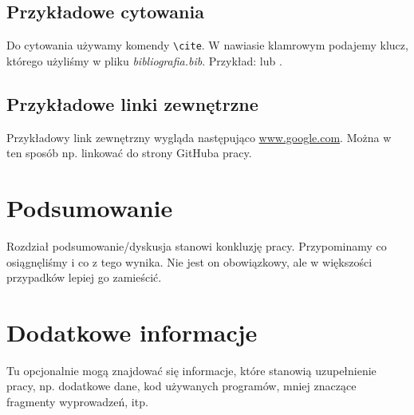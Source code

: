 \documentclass[]{pwr_wmat_praca_dyplomowa}
\theoremstyle{plain}
\numberwithin{theorem}{chapter}
\theoremstyle{definition}
\numberwithin{theorem}{chapter}
\begin{document}
\section{Przykładowe cytowania}

Do cytowania używamy komendy \texttt{\textbackslash cite}. W nawiasie klamrowym podajemy klucz, którego użyliśmy w pliku \emph{bibliografia.bib}. Przykład: \cite{einstein} lub \cite[chap. 2]{latexcompanion}.


\section{Przykładowe linki zewnętrzne}

Przykładowy link zewnętrzny wygląda następująco \url{www.google.com}. Można w ten sposób np. linkować do strony GitHuba pracy.

\chapter{Podsumowanie}
Rozdział podsumowanie/dyskusja stanowi konkluzję pracy. Przypominamy co osiągnęliśmy i co z tego wynika. Nie jest on obowiązkowy, ale w większości przypadków lepiej go zamieścić.

\appendix
\chapter{Dodatkowe informacje}
Tu opcjonalnie mogą znajdować się informacje, które stanowią uzupełnienie pracy, np. dodatkowe dane, kod używanych programów, mniej znaczące fragmenty wyprowadzeń, itp.


\newpage


\end{document}
